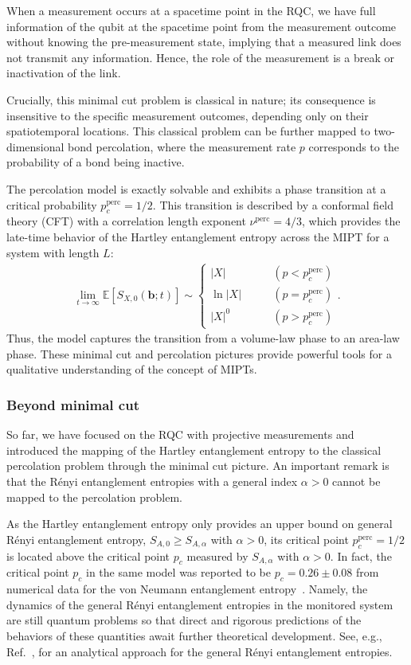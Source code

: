 \documentclass[preprint,pteplogo]{ptephy_v2}%
\numberwithin{equation}{section}
\theoremstyle{definition}
\begin{document}
When a measurement occurs at a spacetime point in the RQC, we have full information of the qubit at the spacetime point from the measurement outcome without knowing the pre-measurement state, implying that a measured link does not transmit any information.
Hence, the role of the measurement is a break or inactivation of the link.

Crucially, this minimal cut problem is classical in nature;
its consequence is insensitive to the specific measurement outcomes, depending only on their spatiotemporal locations.
This classical problem can be further mapped to two-dimensional bond percolation, where the measurement rate $p$ corresponds to the probability of a bond being inactive.

The percolation model is exactly solvable and exhibits a phase transition at a critical probability $p^{\mathrm{perc}}_c=1/2$.
This transition is described by a conformal field theory (CFT) with a correlation length exponent $\nu^{\mathrm{perc}}=4/3$, which provides the late-time behavior of the Hartley entanglement entropy across the MIPT for a system with length $L$:
\begin{align}
    \lim_{t\to\infty}\mathbb{E}[S_{X,0}(\bm{b};\!t)] \sim
    \left\{
    \begin{array}{ll}
    |X| \qquad &(p < p^{\mathrm{perc}}_c) \\
    \ln |X| \qquad &(p = p^{\mathrm{perc}}_c) \\
    |X|^0 \qquad &(p > p^{\mathrm{perc}}_c)
    \end{array}
\right..
\end{align}
Thus, the model captures the transition from a volume-law phase to an area-law phase.
These minimal cut and percolation pictures provide powerful tools for a qualitative understanding of the concept of MIPTs.


\subsubsection{Beyond minimal cut}
So far, we have focused on the RQC with projective measurements and introduced the mapping of the Hartley entanglement entropy to the classical percolation problem through the minimal cut picture.
An important remark is that the R\'enyi entanglement entropies with a general index $\alpha>0$ cannot be mapped to the percolation problem.

As the Hartley entanglement entropy only provides an upper bound on general R\'enyi entanglement entropy, $S_{A,0} \geq S_{A,\alpha}$ with $\alpha>0$, its critical point $p^{\mathrm{perc}}_c=1/2$ is located above the critical point $p_c$ measured by $S_{A,\alpha}$ with $\alpha>0$.
In fact, the critical point $p_c$ in the same model was reported to be $p_c=0.26\pm0.08$ from numerical data for the von Neumann entanglement entropy~\cite{skinner2019measurement}.
Namely, the dynamics of the general R\'enyi entanglement entropies in the monitored system are still quantum problems so that direct and rigorous predictions of the behaviors of these quantities await further theoretical development. 
See, e.g., Ref.~\cite{Potter2022}, for an analytical approach for the general R\'enyi entanglement entropies.
\end{document}
